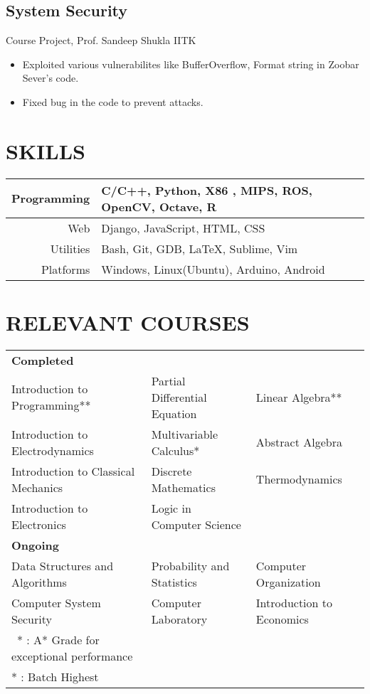 \documentclass{article}
\begin{document}
    \subsection*{System Security}
    {Course Project, Prof. Sandeep Shukla \hfill IITK}
    \begin{itemize} 
        \itemsep0em
        \item Exploited various vulnerabilites like BufferOverflow, Format string in Zoobar Sever's code.
        \item Fixed bug in the code to prevent attacks.
    \end{itemize}
\begin{table}[h]
\section*{SKILLS}
    \begin{tabular}{|r|l|}
        \hline
         Programming & C/C++, Python, X86 , MIPS, ROS, OpenCV, Octave, R \\
         \hline
         Web & Django, JavaScript, HTML, CSS \\ 
         \hline
         Utilities & Bash, Git, GDB, \LaTeX, Sublime, Vim \\
         \hline
         Platforms &  Windows, Linux(Ubuntu), Arduino, Android \\
        \hline
    \end{tabular}
\end{table}


\section*{RELEVANT COURSES}
\begin{tabular}{l l l}
\textbf{Completed}\\
 Introduction to Programming** & Partial Differential Equation & Linear Algebra**\\ 
 Introduction to Electrodynamics & Multivariable Calculus* & Abstract Algebra\\
 Introduction to Classical Mechanics & Discrete Mathematics & Thermodynamics\\
 Introduction to Electronics & Logic in Computer Science\\
\textbf{Ongoing}\\
 Data Structures and Algorithms & Probability and Statistics & Computer Organization\\
 Computer System Security & Computer Laboratory & Introduction to Economics\\

 {\footnotesize \ *  : A* Grade for exceptional performance}\\
 {\footnotesize ** : Batch Highest}
 \end{tabular}
 
\end{document}
